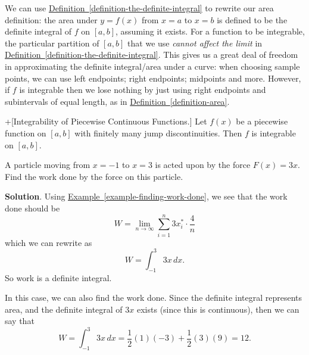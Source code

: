 \documentclass[10pt,]{book}
\theoremstyle{ptxplainnotitle}
\theoremstyle{ptxplaintitle}
\theoremstyle{ptxplainnotitle}
\theoremstyle{ptxplaintitle}
\theoremstyle{ptxplainnotitle}
\theoremstyle{ptxplaintitle}
\theoremstyle{ptxdefinitionnotitle}
\theoremstyle{ptxdefinitiontitle}
\theoremstyle{ptxdefinitionnotitle}
\theoremstyle{ptxdefinitiontitle}
\theoremstyle{ptxdefinitionnotitle}
\theoremstyle{ptxdefinitiontitle}
\theoremstyle{ptxdefinitionnotitle}
\theoremstyle{ptxdefinitiontitle}
\theoremstyle{ptxdefinitionnotitle}
\theoremstyle{ptxdefinitiontitle}
\numberwithin{equation}{section}
\begin{document}
\hypertarget{p-428}{}%
We can use \hyperref[definition-the-definite-integral]{Definition~\ref{definition-the-definite-integral}} to rewrite our area definition: the area under \(y=f(x)\) from \(x=a\) to \(x=b\) is defined to be the definite integral of \(f\) on \([a,b]\), assuming it exists. For a function to be integrable, the particular partition of \([a,b]\) that we use \emph{cannot affect the limit} in \hyperref[definition-the-definite-integral]{Definition~\ref{definition-the-definite-integral}}. This gives us a great deal of freedom in approximating the definite integral/area under a curve: when choosing sample points, we can use left endpoints; right endpoints; midpoints and more. However, if \(f\) is integrable then we lose nothing by just using right endpoints and subintervals of equal length, as in \hyperref[definition-area]{Definition~\ref{definition-area}}.%
\begin{theorem}+[{Integrability of Piecewise Continuous Functions.}]\label{theorem-integrability-of-piecewise-continuous-functions}
\hypertarget{p-429}{}%
Let \(f(x)\) be a piecewise function on \([a,b]\) with finitely many jump discontinuities. Then \(f\) is integrable on \([a,b]\).%
\end{theorem}
\begin{example}\label{example-expressing-work-done}
\hypertarget{p-430}{}%
A particle moving from \(x=-1\) to \(x=3\) is acted upon by the force \(F(x) = 3x\). Find the work done by the force on this particle.%
\par\smallskip%
\noindent\textbf{Solution}.\hypertarget{solution-94}{}\quad%
\hypertarget{p-431}{}%
Using \hyperref[example-finding-work-done]{Example~\ref{example-finding-work-done}}, we see that the work done should be%
\begin{equation*}
W = \lim_{n\to\infty}\sum_{i=1}^{n}3x_{i}^{*}\cdot\frac{4}{n}
\end{equation*}
which we can rewrite as%
\begin{equation*}
W = \int_{-1}^{3}3x\,dx.
\end{equation*}
So work is a definite integral.%
\par
\hypertarget{p-432}{}%
In this case, we can also find the work done. Since the definite integral represents area, and the definite integral of \(3x\) exists (since this is continuous), then we can say that%
\begin{equation*}
W = \int_{-1}^{3}3x\,dx = \frac{1}{2}(1)(-3) + \frac{1}{2}(3)(9) = 12.
\end{equation*}
%
\end{example}
\end{document}
